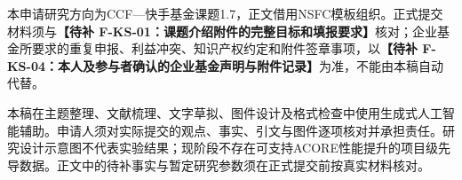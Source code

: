 \justifying
\NSFCBodyText

本申请研究方向为CCF—快手基金课题1.7，正文借用NSFC模板组织。正式提交材料须与\textbf{【待补 F-KS-01：课题介绍附件的完整目标和填报要求】}核对；企业基金所要求的重复申报、利益冲突、知识产权约定和附件签章事项，以\textbf{【待补 F-KS-04：本人及参与者确认的企业基金声明与附件记录】}为准，不能由本稿自动代替。

本稿在主题整理、文献梳理、文字草拟、图件设计及格式检查中使用生成式人工智能辅助。申请人须对实际提交的观点、事实、引文与图件逐项核对并承担责任。研究设计示意图不代表实验结果；现阶段不存在可支持ACORE性能提升的项目级先导数据。正文中的待补事实与暂定研究参数须在正式提交前按真实材料核对。
